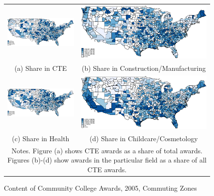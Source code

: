 \begin{figure}[h]\centering\caption{Content of Community College Awards, 2005, Commuting Zones}\begin{tabular}{cc}
\includegraphics[scale=0.34]{./figures/shaw_CTE_2005}&
\includegraphics[scale=0.34]{./figures/shaw_CON_2005}\\
(a) Share in CTE&(b) Share in Construction/Manufacturing\\
\includegraphics[scale=0.34]{./figures/shaw_HEA_2005}&
\includegraphics[scale=0.34]{./figures/shaw_FAM_2005}\\
(c) Share in Health&(d) Share in Childcare/Cosmetology\\
\multicolumn{2}{p{\textwidth}}{\footnotesize Notes. Figure (a) shows CTE awards as a share of total awards. Figures  (b)-(d) show awards in the particular field as a share of all CTE awards. }\\
\end{tabular}
\label{fig:mapawa}
\end{figure}





